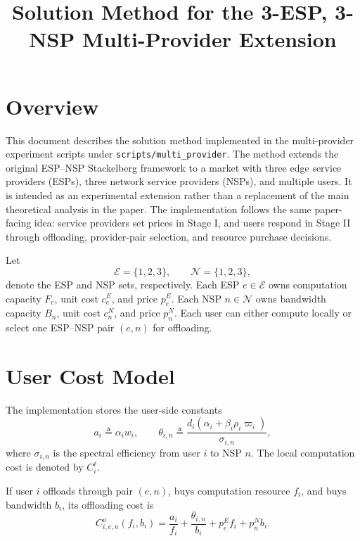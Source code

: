 \documentclass[11pt]{article}
\title{Solution Method for the 3-ESP, 3-NSP Multi-Provider Extension}
\author{}
\date{}
\begin{document}
\maketitle

\section{Overview}

This document describes the solution method implemented in the multi-provider
experiment scripts under \texttt{scripts/multi\_provider}.  The method extends
the original ESP--NSP Stackelberg framework to a market with three edge service
providers (ESPs), three network service providers (NSPs), and multiple users.
It is intended as an experimental extension rather than a replacement of the
main theoretical analysis in the paper.  The implementation follows the same
paper-facing idea: service providers set prices in Stage I, and users respond
in Stage II through offloading, provider-pair selection, and resource purchase
decisions.

Let
\[
    \mathcal E=\{1,2,3\}, \qquad \mathcal N=\{1,2,3\},
\]
denote the ESP and NSP sets, respectively.  Each ESP \(e\in\mathcal E\) owns
computation capacity \(F_e\), unit cost \(c^E_e\), and price \(p^E_e\).  Each
NSP \(n\in\mathcal N\) owns bandwidth capacity \(B_n\), unit cost \(c^N_n\),
and price \(p^N_n\).  Each user can either compute locally or select one
ESP--NSP pair \((e,n)\) for offloading.

\section{User Cost Model}

The implementation stores the user-side constants
\[
    a_i \triangleq \alpha_i w_i,
    \qquad
    \theta_{i,n}\triangleq
    \frac{d_i(\alpha_i+\beta_i\rho_i\varpi_i)}{\sigma_{i,n}},
\]
where \(\sigma_{i,n}\) is the spectral efficiency from user \(i\) to NSP
\(n\).  The local computation cost is denoted by \(C_i^\ell\).

If user \(i\) offloads through pair \((e,n)\), buys computation resource
\(f_i\), and buys bandwidth \(b_i\), its offloading cost is
\begin{equation}
    C^o_{i,e,n}(f_i,b_i)
    =
    \frac{a_i}{f_i}
    +
    \frac{\theta_{i,n}}{b_i}
    +
    p^E_e f_i
    +
    p^N_n b_i .
    \label{eq:multi-provider-offload-cost}
\end{equation}
\end{document}
